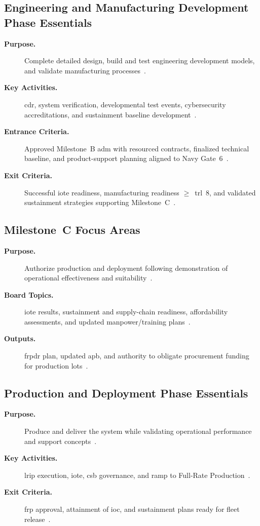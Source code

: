 \documentclass[../main.tex]{subfiles}
\begin{document}
\subsection{Engineering and Manufacturing Development Phase Essentials}
\begin{description}
  \item[\textbf{Purpose.}] Complete detailed design, build and test engineering development models, and validate manufacturing processes~\autocite{DoDI5000-85}.
  \item[\textbf{Key Activities.}] \ac{cdr}, system verification, developmental test events, cybersecurity accreditations, and sustainment baseline development~\autocite{DoDI5000-85}.
  \item[\textbf{Entrance Criteria.}] Approved Milestone~B \ac{adm} with resourced contracts, finalized technical baseline, and product-support planning aligned to Navy Gate~6~\autocite{DoDI5000-85}.
  \item[\textbf{Exit Criteria.}] Successful \ac{iote} readiness, manufacturing readiness $\geq$~\ac{trl}~8, and validated sustainment strategies supporting Milestone~C~\autocite{DoDI5000-85}.
\end{description}

\subsection{Milestone~C Focus Areas}
\begin{description}
  \item[\textbf{Purpose.}] Authorize production and deployment following demonstration of operational effectiveness and suitability~\autocite{DoDI5000-85}.
  \item[\textbf{Board Topics.}] \ac{iote} results, sustainment and supply-chain readiness, affordability assessments, and updated manpower/training plans~\autocite{DoDI5000-85}.
  \item[\textbf{Outputs.}] \ac{frpdr} plan, updated \ac{apb}, and authority to obligate procurement funding for production lots~\autocite{DoDI5000-85}.
\end{description}

\subsection{Production and Deployment Phase Essentials}
\begin{description}
  \item[\textbf{Purpose.}] Produce and deliver the system while validating operational performance and support concepts~\autocite{DoDI5000-85}.
  \item[\textbf{Key Activities.}] \ac{lrip} execution, \ac{iote}, \ac{csb} governance, and ramp to Full-Rate Production~\autocite{DoDI5000-85}.
  \item[\textbf{Exit Criteria.}] \ac{frp} approval, attainment of \ac{ioc}, and sustainment plans ready for fleet release~\autocite{DoDI5000-85}.
\end{description}
\end{document}
